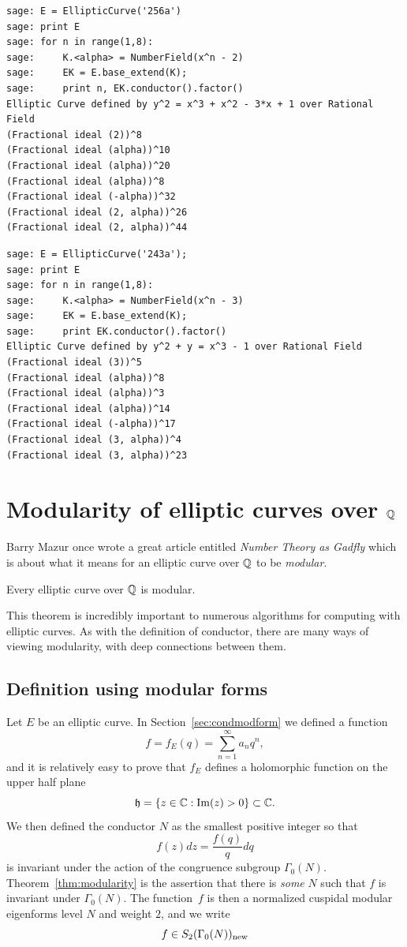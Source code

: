 \documentclass{book}
\begin{document}
\begin{lstlisting}
sage: E = EllipticCurve('256a')
sage: print E
sage: for n in range(1,8):
sage:     K.<alpha> = NumberField(x^n - 2)
sage:     EK = E.base_extend(K);
sage:     print n, EK.conductor().factor()
Elliptic Curve defined by y^2 = x^3 + x^2 - 3*x + 1 over Rational Field
(Fractional ideal (2))^8
(Fractional ideal (alpha))^10
(Fractional ideal (alpha))^20
(Fractional ideal (alpha))^8
(Fractional ideal (-alpha))^32
(Fractional ideal (2, alpha))^26
(Fractional ideal (2, alpha))^44
\end{lstlisting}

\begin{lstlisting}
sage: E = EllipticCurve('243a');
sage: print E
sage: for n in range(1,8):
sage:     K.<alpha> = NumberField(x^n - 3)
sage:     EK = E.base_extend(K);
sage:     print EK.conductor().factor()
Elliptic Curve defined by y^2 + y = x^3 - 1 over Rational Field
(Fractional ideal (3))^5
(Fractional ideal (alpha))^8
(Fractional ideal (alpha))^3
(Fractional ideal (alpha))^14
(Fractional ideal (-alpha))^17
(Fractional ideal (3, alpha))^4
(Fractional ideal (3, alpha))^23
\end{lstlisting}

\section{Modularity of elliptic curves over $\mathbb{Q}$}
Barry Mazur once wrote a great article entitled {\em Number Theory as Gadfly}
which is about what it means for an elliptic curve
over $\mathbb{Q}$ to be {\em modular}.

\begin{theorem}\label{thm:modularity}
Every elliptic curve over $\mathbb{Q}$ is modular.
\end{theorem}
This theorem is incredibly
important to numerous algorithms for computing with elliptic curves.
As with the definition of conductor, there
are many
ways of viewing modularity, with deep connections between them.

\subsection{Definition using modular forms}

Let $E$ be an elliptic curve.
In Section~\ref{sec:condmodform} we defined a function
$$
f = f_E(q) = \sum_{n=1}^{\infty} a_n q^n,
$$
and it is relatively easy to prove that $f_E$ defines
a holomorphic function on the upper half plane
$$
  \mathfrak{h} = \{z \in \mathbb{C} : \operatorname{Im}(z) > 0\} \subset \mathbb{C}.
$$
We then defined the conductor $N$ as the smallest positive
integer so that
$$f(z)dz = \frac{f(q)}{q} dq$$
is invariant
under the action of the congruence subgroup
$\Gamma_0(N)$.   Theorem~\ref{thm:modularity} is  the assertion
that there is {\em some} $N$ such that $f$ is invariant under $\Gamma_0(N)$.
The function~$f$ is then a normalized cuspidal
modular eigenforms level $N$ and weight $2$, and we write
$$
 f \in S_2(\Gamma_0(N))_{\operatorname{new}}
$$
\end{document}
